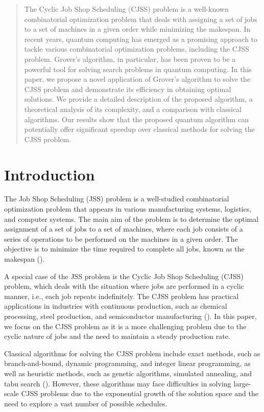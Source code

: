 \begin{abstract}
The Cyclic Job Shop Scheduling (CJSS) problem is a well-known combinatorial optimization problem that deals with assigning a set of jobs to a set of machines in a given order while minimizing the makespan. In recent years, quantum computing has emerged as a promising approach to tackle various combinatorial optimization problems, including the CJSS problem. Grover's algorithm, in particular, has been proven to be a powerful tool for solving search problems in quantum computing. In this paper, we propose a novel application of Grover's algorithm to solve the CJSS problem and demonstrate its efficiency in obtaining optimal solutions. We provide a detailed description of the proposed algorithm, a theoretical analysis of its complexity, and a comparison with classical algorithms. Our results show that the proposed quantum algorithm can potentially offer significant speedup over classical methods for solving the CJSS problem.

\end{abstract}

\section{Introduction}

The Job Shop Scheduling (JSS) problem is a well-studied combinatorial optimization problem that appears in various manufacturing systems, logistics, and computer systems. The main aim of the problem is to determine the optimal assignment of a set of jobs to a set of machines, where each job consists of a series of operations to be performed on the machines in a given order. The objective is to minimize the time required to complete all jobs, known as the makespan (\cite{blazewicz1983scheduling}).

A special case of the JSS problem is the Cyclic Job Shop Scheduling (CJSS) problem, which deals with the situation where jobs are performed in a cyclic manner, i.e., each job repeats indefinitely. The CJSS problem has practical applications in industries with continuous production, such as chemical processing, steel production, and semiconductor manufacturing (\cite{herrmann1993cyclic}). In this paper, we focus on the CJSS problem as it is a more challenging problem due to the cyclic nature of jobs and the need to maintain a steady production rate.

Classical algorithms for solving the CJSS problem include exact methods, such as branch-and-bound, dynamic programming, and integer linear programming, as well as heuristic methods, such as genetic algorithms, simulated annealing, and tabu search (\cite{garey1976complexity, pinfold1991job, dowsland1997job, adams1988fast}). However, these algorithms may face difficulties in solving large-scale CJSS problems due to the exponential growth of the solution space and the need to explore a vast number of possible schedules.

